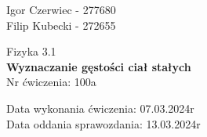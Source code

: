 \documentclass[11pt]{article}
\begin{document}
    \begin{flushright}
        \large{
            Igor Czerwiec - 277680\\
            Filip Kubecki - 272655
        }\\
    \end{flushright}
    \begin{center}
        \large{Fizyka 3.1}\\
        \vspace{2mm}
        \LARGE{\textbf{Wyznaczanie gęstości ciał stałych}}\\
        \vspace{3mm}
        \huge{Nr ćwiczenia: 100a}\\
        \vspace{1cm}
    \end{center}
    \begin{flushright}
        \large{
            Data wykonania ćwiczenia: 07.03.2024r\\
            Data oddania sprawozdania: 13.03.2024r
        }\\
    \end{flushright}
    \vspace{1cm}
\end{document}
